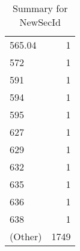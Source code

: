 \begin{table}[ht]
\begin{tabular}{lr}
  565.04 &   1 \\ 
  572 &   1 \\ 
  591 &   1 \\ 
  594 &   1 \\ 
  595 &   1 \\ 
  627 &   1 \\ 
  629 &   1 \\ 
  632 &   1 \\ 
  635 &   1 \\ 
  636 &   1 \\ 
  638 &   1 \\ 
  (Other) & 1749 \\ 
   \hline
\end{tabular}
\caption{Summary for NewSecId} 
\label{tab: NewSecId}
\end{table}
